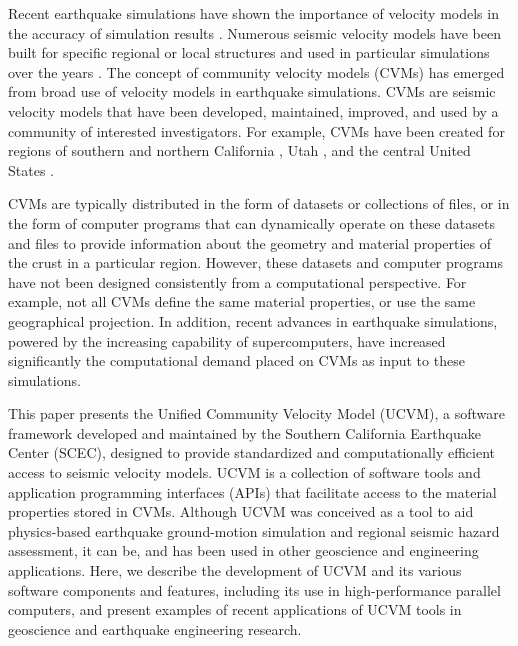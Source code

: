 Recent earthquake simulations have shown the importance of velocity models in the accuracy of simulation results \citep[e.g.,][]{Taborda_2014_BSSA}. Numerous seismic velocity models have been built for specific regional or local structures and used in particular simulations over the years \citep[e.g.,][]{Frankel_1992_BSSA, Brocher_2008_BSSA, Graves_2008_BSSA}. The concept of community velocity models (CVMs) has emerged from broad use of velocity models in earthquake simulations. CVMs are seismic velocity models that have been developed, maintained, improved, and used by a community of interested investigators. For example, CVMs have been created for regions of southern and northern California \citep[][]{Kohler_2003_BSSA, Suss_2003_JGR, Brocher_2006_Proc}, Utah \citep[][]{Magistrale_2006_Tech}, and the central United States  \citep[][]{RamirezGuzman_2012_BSSA}.

CVMs are typically distributed in the form of datasets or collections of files, or in the form of computer programs that can dynamically operate on these datasets and files to provide information about the geometry and material properties of the crust in a particular region. However, these datasets and computer programs have not been designed consistently from a computational perspective. For example, not all CVMs define the same material properties, or use the same geographical projection. In addition, recent advances in earthquake simulations, powered by the increasing capability of supercomputers, have increased significantly the computational demand placed on CVMs as input to these simulations.

This paper presents the Unified Community Velocity Model (UCVM), a software framework developed and maintained by the Southern California Earthquake Center (SCEC), designed to provide standardized and computationally efficient access to seismic velocity models. UCVM is a collection of software tools and application programming interfaces (APIs) that facilitate access to the material properties stored in CVMs. Although UCVM was conceived as a tool to aid physics-based earthquake ground-motion simulation and regional seismic hazard assessment, it can be, and has been used in other geoscience and engineering applications. Here, we describe the development of UCVM and its various software components and features, including its use in high-performance parallel computers, and present examples of recent applications of UCVM tools in geoscience and earthquake engineering research.

